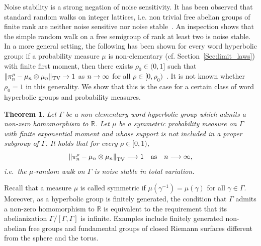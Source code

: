 \documentclass[10pt]{amsart}
\newtheorem{theo}{Theorem}[section]
\theoremstyle{definition}\newtheorem{defi}[theo]{Definition}\newtheorem{rema}[theo]{Remark}\newtheorem{exam}[theo]{Example}\newtheorem{exem}[theo]{Example}\newtheorem{nota}[theo]{Notation}
\DeclareMathOperator{\TV}{TV}
\newcommand{\R}{\mathbb{R}}
\renewcommand{\(}{\left(}
\renewcommand{\)}{\right)}
\renewcommand*{\to}{\mathchoice{\longrightarrow}{\rightarrow}{\rightarrow}{\rightarrow}}
\begin{document}
Noise stability is a strong negation of noise sensitivity. It has been observed that standard random walks on integer lattices, i.e. non trivial free abelian groups of finite rank are neither noise sensitive nor noise stable~\cite[Appendix~A]{Tnss}. An inspection shows that the simple random walk on a free semigroup of rank at least two is noise stable. In a more general setting, the following has been shown for every word hyperbolic group: if a probability measure $\mu$ is non-elementary (cf. Section~\ref{Sec:limit_laws}) with finite first moment, then there exists $\rho_0 \in (0, 1]$ such that $\|\pi^\rho_n-\mu_n\otimes \mu_n\|_{\TV} \to 1$ as $n \to \infty$ for all $\rho \in [0, \rho_0)$~\cite[Theorem~1.3]{NonNS}. It is not known whether $\rho_0=1$ in this generality. We show that this is the case for a certain class of word hyperbolic groups and probability measures.

\begin{theo}\label{Thm:intro}
Let $\Gamma$ be a non-elementary word hyperbolic group which admits a non-zero homomorphism to $\R$. Let $\mu$ be a symmetric probability measure on $\Gamma$ with finite exponential moment and whose support is not included in a proper subgroup of $\Gamma$. It holds that for every $\rho \in [0, 1)$,
\[
\left\|\pi^\rho_n-\mu_n\otimes\mu_n\right\|_{\TV} \to 1 \quad \text{as}\quad n \to \infty,
\]
i.e.\ the $\mu$-random walk on $\Gamma$ is noise stable in total variation.
\end{theo}


Recall that a measure $\mu$ is called symmetric if $\mu(\gamma^{-1})=\mu(\gamma)$ for all $\gamma \in \Gamma$. Moreover, as a hyperbolic group is finitely generated, the condition that $\Gamma$ admits a non-zero homomorphism to $\R$ is equivalent to the requirement that its abelianization $\Gamma/[\Gamma, \Gamma]$ is infinite. Examples include finitely generated non-abelian free groups and fundamental groups of closed Riemann surfaces different from the sphere and the torus.
\end{document}
